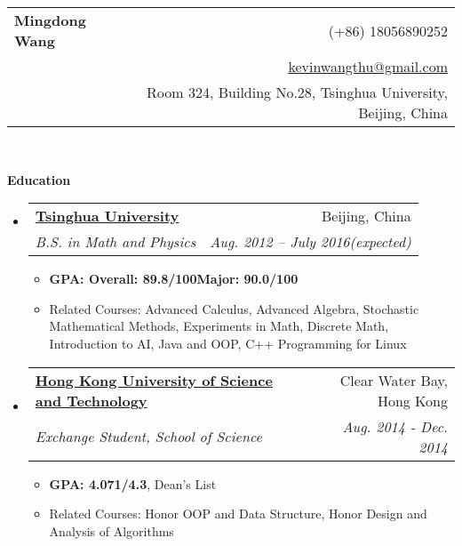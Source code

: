 \documentclass[letterpaper,11pt]{article}
\makeatletter
\newcommand{\resitem}[1]{\item #1 \vspace{-2pt}}
\newcommand{\resheading}[1]{{\large \colorbox{mygrey}{\begin{minipage}{\textwidth}{\textbf{#1 \vphantom{p\^{E}}}}\end{minipage}}}}
\newcommand{\ressubheading}[4]{
  \begin{tabular*}{6.5in}{l@{\extracolsep{\fill}}r}
	#1 & #2 \\
    {#3} & \textit{#4} \\
  \end{tabular*}\vspace{-7pt}}
\newcommand{\ressubsubheading}[2]{
  \begin{tabular*}{6.5in}{l@{\extracolsep{\fill}}r}
	\textit{#1} & \textit{#2} \\
  \end{tabular*}\vspace{-7pt}}
\makeatother
\begin{document}
\newcommand{\mywebheader}{
  \begin{tabular*}{7in}{l@{\extracolsep{\fill}}r}
	\textbf{{\LARGE Mingdong Wang}} &{(+86) 18056890252}\\
	& \href{mailto:kevinwangthu@gmail.com}{kevinwangthu@gmail.com}\\
    & Room 324, Building No.28, Tsinghua University, Beijing, China
  \end{tabular*}
  \\
  \vspace{0.1in}}

\mywebheader

\resheading{Education}
\begin{itemize}
\item
  \ressubheading{\href{http://www.tsinghua.edu.cn}{\textbf{Tsinghua University}}}{Beijing, China}{\textit{B.S. in Math and Physics}}{Aug. 2012 -- July 2016(expected)}
	            {
                  \footnotesize
				  \begin{itemize}
                    \resitem{\textbf{GPA: Overall: 89.8/100\quad Major: 90.0/100}}
                    \resitem{Related Courses: Advanced Calculus, Advanced Algebra, Stochastic Mathematical Methods, Experiments in Math, Discrete Math, Introduction to AI, Java and OOP, C++ Programming for Linux}
				  \end{itemize}
				}
		      \item
			    \ressubheading{\href{http://www.ust.hk}{\textbf{Hong Kong University of Science and Technology}}}{Clear Water Bay, Hong Kong}{\textit{Exchange Student, School of Science}}{Aug. 2014 - Dec. 2014}
				              { \footnotesize
				                \begin{itemize}
				                  \resitem{\textbf{GPA: 4.071/4.3}, Dean's List}
                                  \resitem{Related Courses: Honor OOP and Data Structure, Honor Design and Analysis of Algorithms}
				                \end{itemize}
				              }

\end{itemize} %
\end{document}
